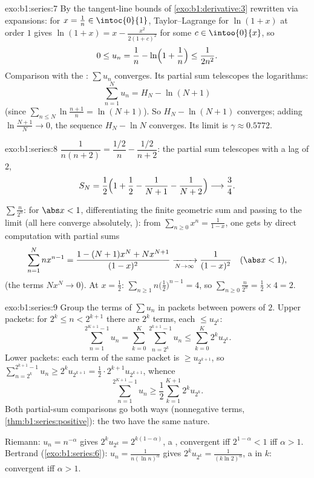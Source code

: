 \begin{solution}{exo:b1:series:7}
By the tangent-line bounds of \cref{exo:b1:derivative:3} rewritten
via expansions: for $x = \frac1n \in \intoc{0}{1}$, Taylor--Lagrange
for $\ln(1+x)$ at order $1$ gives $\ln(1 + x) = x - \frac{x^2}{2(1 +
c)^2}$ for some $c \in \intoo{0}{x}$, so
\[
0 \leq u_n = \frac1n - \ln\Bigl(1 + \frac1n\Bigr) \leq
\frac{1}{2n^2} .
\]
Comparison with the : $\sum u_n$ converges. Its partial
sum telescopes the logarithms:
\[
\sum_{n=1}^{N} u_n = H_N - \ln(N+1)
\]
(since $\sum_{n\leq N} \ln\frac{n+1}{n} = \ln(N+1)$). So $H_N -
\ln(N+1)$ converges; adding $\ln\frac{N+1}{N} \to 0$, the sequence
$H_N - \ln N$ converges. Its limit is $\gamma \approx 0.5772$.
\end{solution}

\begin{solution}{exo:b1:series:8}
$\dfrac{1}{n(n+2)} = \dfrac{1/2}{n} - \dfrac{1/2}{n+2}$: the partial
sum telescopes with a lag of $2$,
\[
S_N = \frac12\Bigl(1 + \frac12 - \frac{1}{N+1} -
\frac{1}{N+2}\Bigr) \longrightarrow \frac34 .
\]

$\sum \frac{n}{2^n}$: for $\abs x < 1$, differentiating the finite
geometric sum and passing to the limit (all  here converge
absolutely, ): from $\sum_{n\geq0} x^n = \frac{1}{1-x}$,
one gets by direct computation with partial sums
\[
\sum_{n=1}^{N} n x^{n-1}
= \frac{1 - (N+1)x^N + N x^{N+1}}{(1 - x)^2}
\xrightarrow[N\to\infty]{} \frac{1}{(1-x)^2}
\quad (\abs x < 1),
\]
(the  terms $N x^N \to 0$). At $x = \frac12$:
$\sum_{n\geq1} n\bigl(\frac12\bigr)^{n-1} = 4$, so $\sum_{n\geq0}
\frac{n}{2^n} = \frac12 \times 4 = 2$.
\end{solution}

\begin{solution}{exo:b1:series:9}
Group the terms of $\sum u_n$ in packets between powers of $2$.
Upper packets: for $2^k \leq n < 2^{k+1}$ there are $2^k$ terms,
each $\leq u_{2^k}$:
\[
\sum_{n=1}^{2^{K+1}-1} u_n
= \sum_{k=0}^{K} \sum_{n=2^k}^{2^{k+1}-1} u_n
\leq \sum_{k=0}^{K} 2^k u_{2^k} .
\]
Lower packets: each term of the same packet is $\geq u_{2^{k+1}}$,
so $\sum_{n=2^k}^{2^{k+1}-1} u_n \geq 2^k u_{2^{k+1}} = \frac12
\cdot 2^{k+1} u_{2^{k+1}}$, whence
\[
\sum_{n=1}^{2^{K+1}-1} u_n \geq \frac12 \sum_{k=1}^{K+1} 2^{k}
u_{2^{k}} .
\]
Both partial-sum comparisons go both ways (nonnegative terms,
\cref{thm:b1:series:positive}): the two  have the same nature.

Riemann: $u_n = n^{-\alpha}$ gives $2^k u_{2^k} =
2^{k(1-\alpha)}$, a , convergent iff $2^{1 - \alpha}
< 1$ iff $\alpha > 1$. Bertrand
(\cref{exo:b1:series:6}): $u_n = \frac{1}{n(\ln n)^\alpha}$ gives
$2^k u_{2^k} = \frac{1}{(k\ln 2)^\alpha}$, a  in $k$:
convergent iff $\alpha > 1$.
\end{solution}

